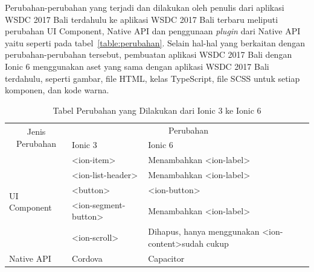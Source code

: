 Perubahan-perubahan yang terjadi dan dilakukan oleh penulis dari aplikasi WSDC 2017 Bali terdahulu ke aplikasi WSDC 2017 Bali terbaru meliputi perubahan UI Component, Native API dan penggunaan \textit{plugin} dari Native API yaitu seperti pada tabel~\ref{table:perubahan}. Selain hal-hal yang berkaitan dengan perubahan-perubahan tersebut, pembuatan aplikasi WSDC 2017 Bali dengan Ionic 6 menggunakan aset yang sama dengan aplikasi WSDC 2017 Bali terdahulu, seperti gambar, file HTML, kelas TypeScript, file SCSS untuk setiap komponen, dan kode warna.

\begin{table}[H]
\centering
\caption{Tabel Perubahan yang Dilakukan dari Ionic 3 ke Ionic 6}
\begin{tabular}{|l|ll|}
\hline
\multicolumn{1}{|c|}{\multirow{2}{*}{Jenis Perubahan}} & \multicolumn{2}{c|}{Perubahan}                                                                                                               \\ \cline{2-3} 
\multicolumn{1}{|c|}{}                                 & \multicolumn{1}{l|}{Ionic 3}                                     & Ionic 6                                                                   \\ \hline
\multirow{5}{*}{UI Component}                          & \multicolumn{1}{l|}{\textless{}ion-item\textgreater{}}           & Menambahkan  \textless{}ion-label\textgreater{}                           \\ \cline{2-3} 
                                                       & \multicolumn{1}{l|}{\textless{}ion-list-header\textgreater{}}    & Menambahkan \textless{}ion-label\textgreater{}                            \\ \cline{2-3} 
                                                       & \multicolumn{1}{l|}{\textless{}button\textgreater{}}             & \textless{}ion-button\textgreater{}                                       \\ \cline{2-3} 
                                                       & \multicolumn{1}{l|}{\textless{}ion-segment-button\textgreater{}} & Menambahkan \textless{}ion-label\textgreater{}                            \\ \cline{2-3} 
                                                       & \multicolumn{1}{l|}{\textless{}ion-scroll\textgreater{}}         & Dihapus, hanya menggunakan \textless{}ion-content\textgreater sudah cukup \\ \hline
Native API                                             & \multicolumn{1}{l|}{Cordova}                                     & Capacitor                                                                 \\ \hline

\end{tabular}
\end{table}
